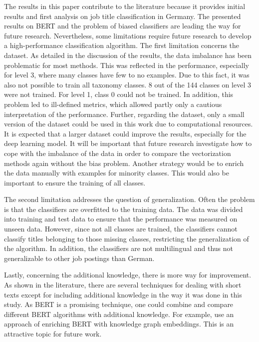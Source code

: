 \documentclass[12pt, a4paper, titlepage]{article}
\begin{document}
The results in this paper contribute to the literature because it provides initial results and first analysis on job title classification in Germany. The presented results on \ac{BERT} and the problem of biased classifiers are leading the way for future research. Nevertheless, some limitations require future research to develop a high-performance classification algorithm. The first limitation concerns the dataset. As detailed in the discussion of the results, the data imbalance has been problematic for most methods. This was reflected in the performance, especially for level 3, where many classes have few to no examples. Due to this fact, it was also not possible to train all taxonomy classes. 8 out of the 144 classes on level 3 were not trained. For level 1, class 0 could not be trained. In addition, this problem led to ill-defined metrics, which allowed partly only a cautious interpretation of the performance. Further, regarding the dataset, only a small version of the dataset could be used in this work due to computational resources. It is expected that a larger dataset could improve the results, especially for the deep learning model. It will be important that future research investigate how to cope with the imbalance of the data in order to compare the vectorization methods again without the bias problem. Another strategy would be to enrich the data manually with examples for minority classes. This would also be important to ensure the training of all classes.  

The second limitation addresses the question of generalization. Often the problem is that the classifiers are overfitted to the training data. The data was divided into training and test data to ensure that the performance was measured on unseen data. However, since not all classes are trained, the classifiers cannot classify titles belonging to those missing classes, restricting the generalization of the algorithm. In addition, the classifiers are not multilingual and thus not generalizable to other job postings than German.  

Lastly, concerning the additional knowledge, there is more way for improvement. As shown in the literature, there are several techniques for dealing with short texts except for including additional knowledge in the way it was done in this study. As \ac{BERT} is a promising technique, one could combine and compare different \ac{BERT} algorithms with additional knowledge. For example, \citet{ostendorff2019} use an approach of enriching \ac{BERT} with knowledge graph embeddings. This is an attractive topic for future work. 
\end{document}
